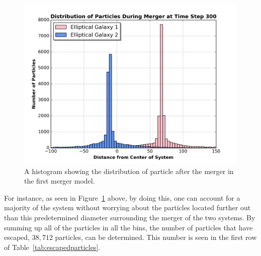 \documentclass[12pt]{report}
\begin{document}
\begin{figure}[H]
    \centering
    \includegraphics[scale=0.5]{histogram_final_distributionofparticlesfromcenter_aftermerger.png}
    \caption{A histogram showing the distribution of particle after the merger in the first merger model.}
    \label{fig:histdist_merger1}
\end{figure}

For instance, as seen in Figure~\ref{fig:histdist_merger1} above, by doing this, one can account for a majority of the system without worrying about the particles located further out than this predetermined diameter surrounding the merger of the two systems. By summing up all of the particles in all the bins, the number of particles that have escaped, $38,712$ particles, can be determined. This number is seen in the first row of Table~\ref{tab:escapedparticles}.
\end{document}
